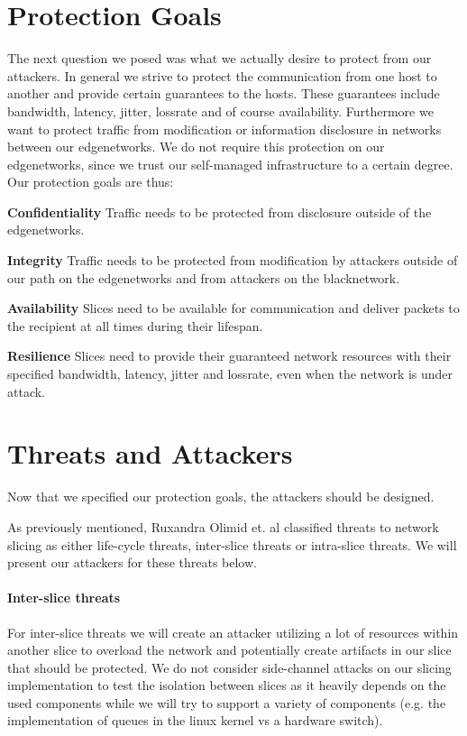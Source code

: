 \section{Protection Goals}
\label{protection_goals}
The next question we posed was what we actually desire to protect from our attackers. In general we strive to protect the communication from one host to another and provide certain guarantees to the hosts. These guarantees include \gls{bandwidth}, \gls{latency}, \gls{jitter}, \gls{lossrate} and of course availability. Furthermore we want to protect traffic from modification or information disclosure in networks between our \gls{edgenetwork}s. We do not require this protection on our \gls{edgenetwork}s, since we trust our self-managed infrastructure to a certain degree. Our protection goals are thus:
\begin{description}[style=multiline, labelwidth=0.7cm]
    \item[\namedlabel{P1}{P1}] \textbf{Confidentiality} Traffic needs to be protected from disclosure outside of the \gls{edgenetwork}s.
    \item[\namedlabel{P2}{P2}] \textbf{Integrity} Traffic needs to be protected from modification by attackers outside of our path on the \gls{edgenetwork}s and from attackers on the \gls{blacknetwork}.
    \item[\namedlabel{P3}{P3}] \textbf{Availability} Slices need to be available for communication and deliver packets to the recipient at all times during their lifespan.
    \item[\namedlabel{P4}{P4}] \textbf{Resilience} Slices need to provide their guaranteed network resources with their specified \gls{bandwidth}, \gls{latency}, \gls{jitter} and \gls{lossrate}, even when the network is under attack.
\end{description}


\section{Threats and Attackers}
\label{adversaries}
Now that we specified our protection goals, the attackers should be designed.

As previously mentioned, Ruxandra Olimid et. al \cite{SE2} classified threats to network slicing as either life-cycle threats, inter-slice threats or intra-slice threats. We will present our attackers for these threats below.

\paragraph{Inter-slice threats} For inter-slice threats we will create an attacker utilizing a lot of resources within another slice to overload the network and potentially create artifacts in our slice that should be protected. We do not consider side-channel attacks on our slicing implementation to test the isolation between slices as it heavily depends on the used components while we will try to support a variety of components (e.g. the implementation of queues in the linux kernel vs a hardware switch).

